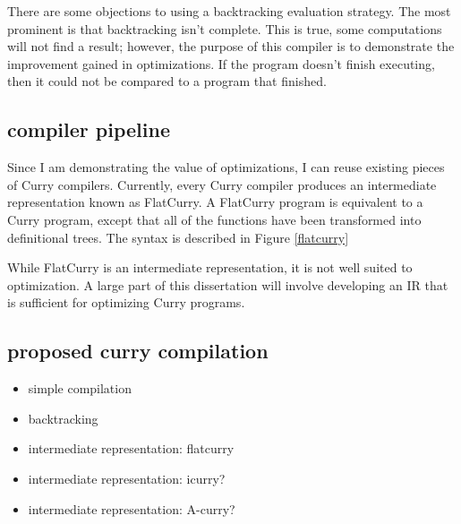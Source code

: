 There are some objections to using a backtracking evaluation strategy.
The most prominent is that backtracking isn't complete.
This is true, some computations will not find a result;
however, the purpose of this compiler is to demonstrate the improvement gained in optimizations.
If the program doesn't finish executing, then it could not be compared to a program that finished.


\subsection{compiler pipeline}
Since I am demonstrating the value of optimizations, I can reuse existing pieces of Curry compilers.
Currently, every Curry compiler produces an intermediate representation known as FlatCurry.
A FlatCurry program is equivalent to a Curry program, except that all of the functions have been transformed into
definitional trees.  The syntax is described in Figure \ref{flatcurry}

While FlatCurry is an intermediate representation, it is not well suited to optimization.
A large part of this dissertation will involve developing an IR that is sufficient for optimizing Curry programs.

\subsection{proposed curry compilation}
\begin{itemize}
  \item simple compilation
  \item backtracking
  \item intermediate representation: flatcurry
  \item intermediate representation: icurry?
  \item intermediate representation: A-curry?
\end{itemize}
